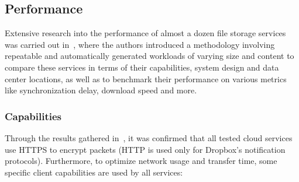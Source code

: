 \subsection{Performance}
Extensive research into the performance of almost a dozen file storage services was carried out in~\cite{personal1}, where the authors introduced a methodology involving repeatable and automatically generated workloads of varying size and content  to compare these services in terms of their capabilities, system design and data center locations, as well as to benchmark their performance on various metrics like synchronization delay, download speed and more.

\subsubsection{Capabilities}
Through the results gathered in~\cite{personal1}, it was confirmed that all tested cloud services use HTTPS to encrypt packets (HTTP is used only for Dropbox's notification protocols). Furthermore, to optimize network usage and transfer time, some specific client capabilities are used by all services:


